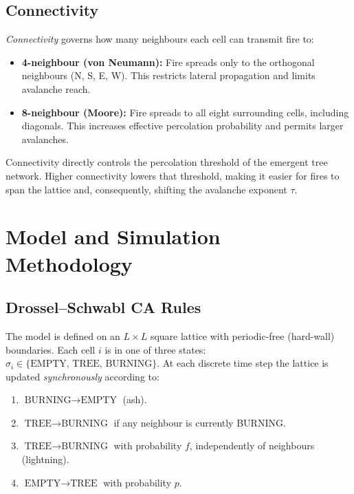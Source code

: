\documentclass[12pt,a4paper]{article}
\begin{document}
\subsection{Connectivity}
\emph{Connectivity} governs how many neighbours each cell can transmit
fire to:
\begin{itemize}
  \item \textbf{4-neighbour (von Neumann):} Fire spreads only to the
        orthogonal neighbours (N, S, E, W). This restricts lateral
        propagation and limits avalanche reach.
  \item \textbf{8-neighbour (Moore):} Fire spreads to all eight
        surrounding cells, including diagonals. This increases
        effective percolation probability and permits larger avalanches.
\end{itemize}
Connectivity directly controls the percolation threshold of the
emergent tree network. Higher connectivity lowers that threshold,
making it easier for fires to span the lattice and, consequently,
shifting the avalanche exponent $\tau$.

\section{Model and Simulation Methodology}
\label{sec:methods}

\subsection{Drossel--Schwabl CA Rules}
The model is defined on an $L\times L$ square lattice with periodic-free
(hard-wall) boundaries. Each cell $i$ is in one of three states:
$\sigma_i \in \{\text{EMPTY},\, \text{TREE},\, \text{BURNING}\}$.
At each discrete time step the lattice is updated \emph{synchronously}
according to:

\begin{enumerate}
  \item $\text{BURNING} \rightarrow \text{EMPTY}$ (ash).
  \item $\text{TREE} \rightarrow \text{BURNING}$ if any neighbour is
        currently BURNING.
  \item $\text{TREE} \rightarrow \text{BURNING}$ with probability $f$,
        independently of neighbours (lightning).
  \item $\text{EMPTY} \rightarrow \text{TREE}$ with probability $p$.
\end{enumerate}
\end{document}

